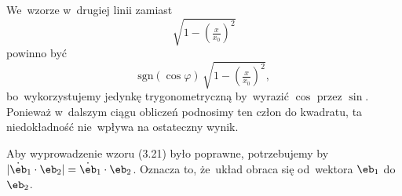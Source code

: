 \documentclass[a4paper,11pt]{article}
\begin{document}

\start {} We~wzorze w~drugiej linii zamiast
\begin{equation}
  \sqrt{1 - \left( \tfrac{ x }{ x_{ 0 } } \right)^{ 2 } }
\end{equation}
powinno być
\begin{equation}
  \mathrm{sgn}( \cos \varphi ) \, \sqrt{1 - \left( \tfrac{ x }{ x_{ 0 } }
    \right)^{ 2 } },
\end{equation}
bo~wykorzystujemy jedynkę trygonometryczną by~wyrazić $\cos$ przez
$\sin$. Ponieważ w~dalszym ciągu obliczeń podnosimy ten człon do
kwadratu, ta niedokładność nie~wpływa na ostateczny wynik.

\vspace{\spaceFour}


\start {} Aby wyprowadzenie wzoru (3.21) było poprawne,
potrzebujemy by
$| \dot{ \eb }_{ 1 } \cdot \eb_{ 2 } | = \dot{ \eb }_{ 1 } \cdot \eb_{
  2 }$. Oznacza to, że~układ obraca się od~wektora $\eb_{ 1 }$
do~$\eb_{ 2 }$.
\end{document}
